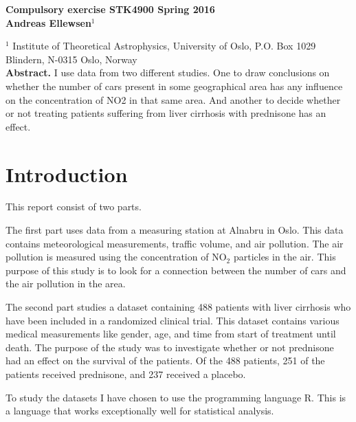 \documentclass[a4paper]{article}
\begin{document}
  
\vspace*{4ex}
\begin{center}
  {\Large \bf Compulsory exercise STK4900 Spring 2016}\\[4ex]
  {\large \bf Andreas Ellewsen$^1$}\\[4ex]
  \begin{minipage}[t]{15cm}
        $^1$ Institute of Theoretical Astrophysics, University of Oslo, P.O. Box 1029 Blindern, N-0315 Oslo, Norway\\
                     
    {\bf Abstract.} I use data from two different studies. One to draw conclusions on whether the number of cars present in some geographical area has any influence on the concentration of NO2 in that same area. And another to decide whether or not treating patients suffering from liver cirrhosis with prednisone has an effect.
    
  \vspace*{2ex}
  \end{minipage}
\end{center}

\section{Introduction}\label{sec:introduction}
This report consist of two parts. 

The first part uses data from a measuring station at Alnabru in Oslo. This data contains meteorological measurements, traffic volume, and air pollution. The air pollution is measured using the concentration of NO$_2$ particles in the air.
This purpose of this study is to look for a connection between the number of cars and the air pollution in the area.

The second part studies a dataset containing 488 patients with liver cirrhosis who have been included in a randomized clinical trial. This dataset contains various medical measurements like gender, age, and time from start of treatment until death. The purpose of the study was to investigate whether or not prednisone had an effect on the survival of the patients. Of the 488 patients, 251 of the patients received prednisone, and 237 received a placebo. 

To study the datasets I have chosen to use the programming language R. This is a language that works exceptionally well for statistical analysis.
\end{document}
